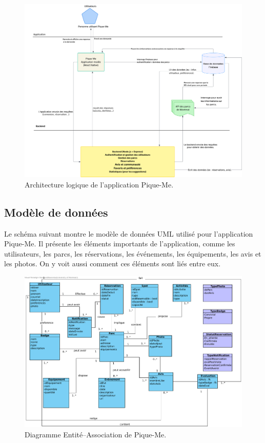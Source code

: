 \documentclass[12pt,a4paper]{article}
\begin{document}
\begin{figure}[H]
  \centering
  \includegraphics[width=0.9\linewidth]{attachments/architecture.pdf}
  \caption{Architecture logique de l'application Pique-Me.}
\end{figure}

\subsection{Modèle de données}

Le schéma suivant montre le modèle de données UML utilisé pour l'application Pique-Me.
Il présente les éléments importants de l'application, comme les utilisateurs, les parcs, les réservations, les événements, les équipements, les avis et les photos.
On y voit aussi comment ces éléments sont liés entre eux. 

\begin{figure}[H]
  \centering
  \includegraphics[width=0.9\linewidth]{attachments/donnee.pdf}
  \caption{Diagramme Entité–Association de Pique-Me.}
\end{figure}
\end{document}
